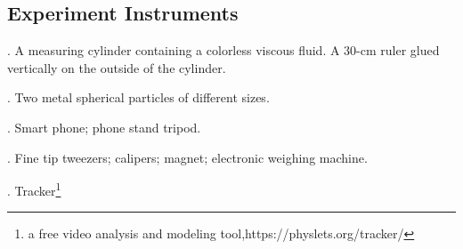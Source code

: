 \documentclass{report}
\begin{document}
\subsection{Experiment Instruments}
. A measuring cylinder containing a colorless viscous fluid. A 30-cm ruler glued vertically on the outside of the cylinder. \par {}. Two metal spherical particles of different sizes. \par {}. Smart phone; phone stand tripod. \par {}. Fine tip tweezers; calipers; magnet; electronic weighing machine. \par {}. Tracker\footnote{ a free video analysis and modeling tool,https://physlets.org/tracker/}
\begin{figure}[H]
\centering
{}
\end{figure}
\clearpage
\end{document}
